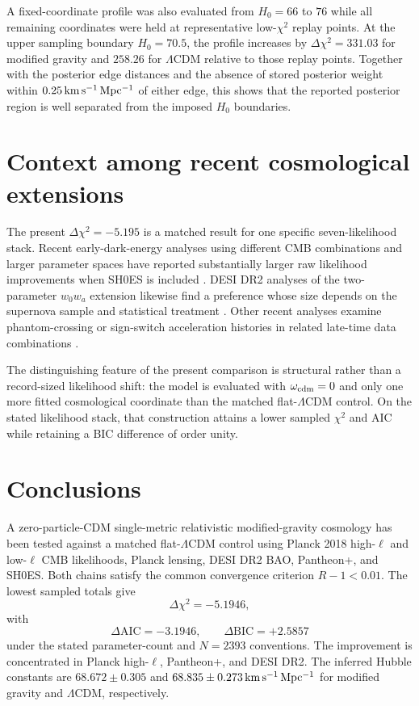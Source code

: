 \documentclass[aps,prd,twocolumn,superscriptaddress,nofootinbib,longbibliography,floatfix]{revtex4-2}
\newcommand{\LCDM}{\Lambda\mathrm{CDM}}
\begin{document}
A fixed-coordinate profile was also evaluated from $H_0=66$ to $76$ while all remaining coordinates were held at representative low-$\chi^2$ replay points. At the upper sampling boundary $H_0=70.5$, the profile increases by $\Delta\chi^2=331.03$ for modified gravity and $258.26$ for $\LCDM$ relative to those replay points. Together with the posterior edge distances and the absence of stored posterior weight within $0.25\,{\rm km\,s^{-1}\,Mpc^{-1}}$ of either edge, this shows that the reported posterior region is well separated from the imposed $H_0$ boundaries.

\section{Context among recent cosmological extensions}\label{sec:context}
The present $\Delta\chi^2=-5.195$ is a matched result for one specific seven-likelihood stack. Recent early-dark-energy analyses using different CMB combinations and larger parameter spaces have reported substantially larger raw likelihood improvements when SH0ES is included \cite{Poulin2025EDE}. DESI DR2 analyses of the two-parameter $w_0w_a$ extension likewise find a preference whose size depends on the supernova sample and statistical treatment \cite{DESIDR2II2025,DESIDR2Extended2025,Ormondroyd2025,WangMota2025}. Other recent analyses examine phantom-crossing or sign-switch acceleration histories in related late-time data combinations \cite{Pang2025DDE,Dixit2026SignSwitch}.

The distinguishing feature of the present comparison is structural rather than a record-sized likelihood shift: the model is evaluated with $\omega_{\rm cdm}=0$ and only one more fitted cosmological coordinate than the matched flat-$\LCDM$ control. On the stated likelihood stack, that construction attains a lower sampled $\chi^2$ and AIC while retaining a BIC difference of order unity.

\section{Conclusions}\label{sec:conclusion}
A zero-particle-CDM single-metric relativistic modified-gravity cosmology has been tested against a matched flat-$\LCDM$ control using Planck 2018 high-$\ell$ and low-$\ell$ CMB likelihoods, Planck lensing, DESI DR2 BAO, Pantheon+, and SH0ES. Both chains satisfy the common convergence criterion $R-1<0.01$. The lowest sampled totals give
\begin{equation}
\Delta\chi^2=-5.1946,
\end{equation}
with
\begin{equation}
\Delta\mathrm{AIC}=-3.1946,\qquad \Delta\mathrm{BIC}=+2.5857
\end{equation}
under the stated parameter-count and $N=2393$ conventions. The improvement is concentrated in Planck high-$\ell$, Pantheon+, and DESI DR2. The inferred Hubble constants are $68.672\pm0.305$ and $68.835\pm0.273\,{\rm km\,s^{-1}\,Mpc^{-1}}$ for modified gravity and $\LCDM$, respectively.
\end{document}

